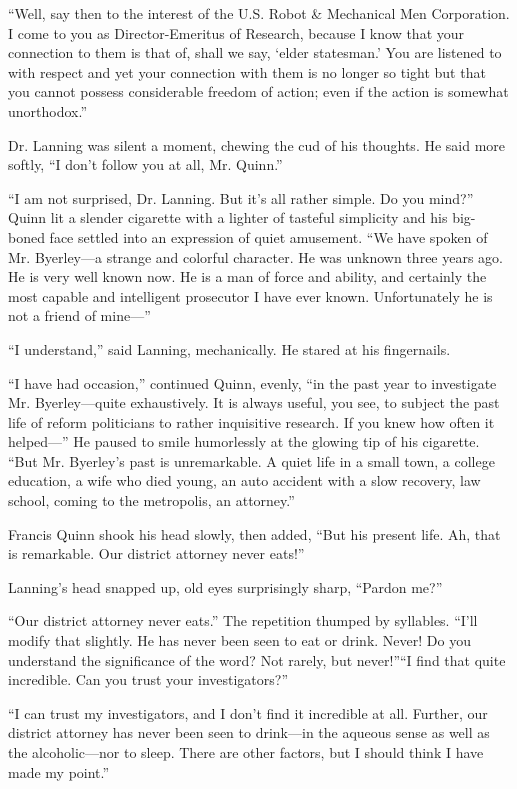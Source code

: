 \documentclass[10pt,a5paper,twoside]{book}
\begin{document}
“Well, say then to the interest of the U.S. Robot \& Mechanical Men Corporation. I come to you as Director-Emeritus of Research, because I know that your connection to them is that of, shall we say, ‘elder statesman.’ You are listened to with respect and yet your connection with them is no longer so tight but that you cannot possess considerable freedom of action; even if the action is somewhat unorthodox.”

Dr. Lanning was silent a moment, chewing the cud of his thoughts. He said more softly, “I don’t follow you at all, Mr. Quinn.”

“I am not surprised, Dr. Lanning. But it’s all rather simple. Do you mind?” Quinn lit a slender cigarette with a lighter of tasteful simplicity and his big- boned face settled into an expression of quiet amusement. “We have spoken of Mr. Byerley—a strange and colorful character. He was unknown three years ago. He is very well known now. He is a man of force and ability, and certainly the most capable and intelligent prosecutor I have ever known. Unfortunately he is not a friend of mine—”

“I understand,” said Lanning, mechanically. He stared at his fingernails.

“I have had occasion,” continued Quinn, evenly, “in the past year to investigate Mr. Byerley—quite exhaustively. It is always useful, you see, to subject the past life of reform politicians to rather inquisitive research. If you knew how often it helped—” He paused to smile humorlessly at the glowing tip of his cigarette. “But Mr. Byerley’s past is unremarkable. A quiet life in a small town, a college education, a wife who died young, an auto accident with a slow recovery, law school, coming to the metropolis, an attorney.”

Francis Quinn shook his head slowly, then added, “But his present life. Ah, that is remarkable. Our district attorney never eats!”

Lanning’s head snapped up, old eyes surprisingly sharp, “Pardon me?”

“Our district attorney never eats.” The repetition thumped by syllables. “I’ll modify that slightly. He has never been seen to eat or drink. Never! Do you understand the significance of the word? Not rarely, but never!”“I find that quite incredible. Can you trust your investigators?”

“I can trust my investigators, and I don’t find it incredible at all. Further, our district attorney has never been seen to drink—in the aqueous sense as well as the alcoholic—nor to sleep. There are other factors, but I should think I have made my point.”
\end{document}
